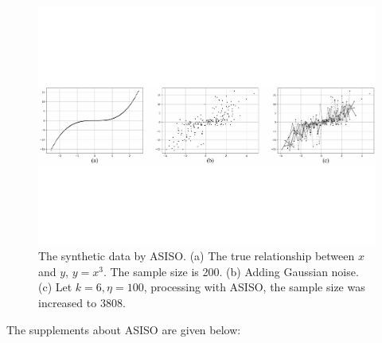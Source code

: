 \documentclass[sn-mathphys,Numbered]{sn-jnl}%
\theoremstyle{thmstyleone}%
\theoremstyle{thmstyletwo}%
\theoremstyle{thmstylethree}%
\begin{document}
\begin{figure}[H]%
\centering
\vspace{-3.15cm}   %
\setlength{\abovecaptionskip}{0.cm} %
\setlength{\abovecaptionskip}{-3.4cm} %
\includegraphics[width=1\textwidth]{fig2.pdf}
\caption{The synthetic data by ASISO. (a) The true relationship between $x$ and $y$, $y=x^3$. The sample size is 200. (b) Adding Gaussian noise. (c) Let $k=6,\eta=100$, processing with ASISO, the sample size was increased to 3808.}\label{fig2}
\end{figure}

The supplements about ASISO are given below:
\end{document}
